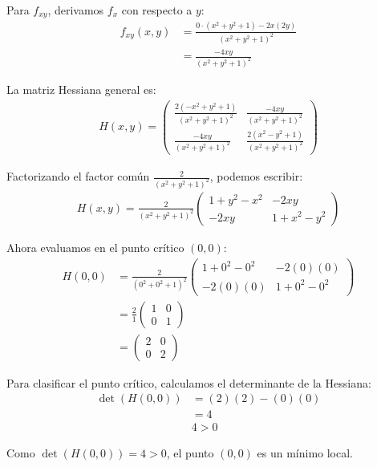 \documentclass{article}
\begin{document}
Para $f_{xy}$, derivamos $f_x$ con respecto a $y$:
\begin{align}
f_{xy}(x,y) &= \frac{0 \cdot (x^2 + y^2 + 1) - 2x(2y)}{(x^2 + y^2 + 1)^2} \\
&= \frac{-4xy}{(x^2 + y^2 + 1)^2}
\end{align}

La matriz Hessiana general es:
\begin{align}
H(x,y) =  \begin{pmatrix} 
\frac{2(-x^2 + y^2 + 1)}{(x^2 + y^2 + 1)^2} & \frac{-4xy}{(x^2 + y^2 + 1)^2} \\
\frac{-4xy}{(x^2 + y^2 + 1)^2} & \frac{2(x^2 - y^2 + 1)}{(x^2 + y^2 + 1)^2}
\end{pmatrix}
\end{align}

Factorizando el factor común $\frac{2}{(x^2 + y^2 + 1)^2}$, podemos escribir:
\begin{align}
H(x,y) = \frac{2}{(x^2 + y^2 + 1)^2} \begin{pmatrix} 
1 + y^2 - x^2 & -2xy \\
-2xy & 1 + x^2 - y^2
\end{pmatrix}
\end{align}

Ahora evaluamos en el punto crítico $(0,0)$:
\begin{align}
H(0,0) &= \frac{2}{(0^2 + 0^2 + 1)^2} \begin{pmatrix} 
1 + 0^2 - 0^2 & -2(0)(0) \\
-2(0)(0) & 1 + 0^2 - 0^2
\end{pmatrix} \\
&= \frac{2}{1} \begin{pmatrix} 
1 & 0 \\
0 & 1
\end{pmatrix} \\
&= \begin{pmatrix} 
2 & 0 \\
0 & 2
\end{pmatrix}
\end{align}

Para clasificar el punto crítico, calculamos el determinante de la Hessiana:
\begin{align}
\det(H(0,0)) &= (2)(2) - (0)(0) \\
&= 4 \\
&4>0
\end{align}

Como $\det(H(0,0)) = 4 > 0$, el punto $(0,0)$ es un mínimo local.
\end{document}
